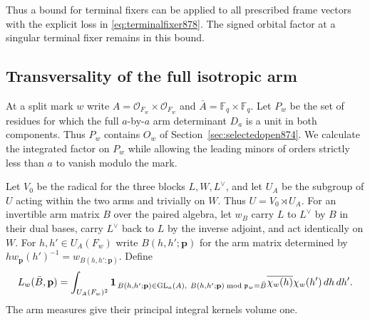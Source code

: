 \documentclass[a4paper,11pt]{article}
\theoremstyle{definition}
\theoremstyle{remark}
\numberwithin{equation}{section}
\begin{document}
Thus a bound for terminal fixers can be applied to all prescribed
frame vectors with the explicit loss in \eqref{eq:terminalfixer878}.
The signed orbital factor at a singular terminal fixer remains in
this bound.
\clearpage

\subsection{Transversality of the full isotropic arm}
\label{sec:armopen879}

At a split mark \(w\) write \(A=\mathcal O_{F_w}\times\mathcal O_{F_w}\)
and \(\bar A=\mathbb F_q\times\mathbb F_q\).
Let \(P_w\) be the set of residues for which the full \(a\)-by-\(a\)
arm determinant \(D_a\) is a unit in both components. Thus \(P_w\)
contains \(O_w\) of Section~\ref{sec:selectedopen874}. We calculate
the integrated factor on \(P_w\) while allowing the leading minors
of orders strictly less than \(a\) to vanish modulo the mark.

Let \(V_0\) be the radical for the three blocks \(L,W,L^\vee\),
and let \(U_A\) be the subgroup of \(U\) acting within the two arms
and trivially on \(W\). Thus \(U=V_0\rtimes U_A\). For an invertible
arm matrix \(B\) over the paired algebra, let \(w_B\) carry \(L\)
to \(L^\vee\) by \(B\) in their dual bases, carry \(L^\vee\) back to
\(L\) by the inverse adjoint, and act identically on \(W\).
For \(h,h'\in U_A(F_w)\) write \(B(h,h';\mathbf p)\) for the
arm matrix determined by \(h w_{\mathbf p}(h')^{-1}=w_{B(h,h';\mathbf p)}\).
Define
\[
 L_w(\bar B,\mathbf p)=\int_{U_A(F_w)^2}
 {\bf1}_{\,B(h,h';\mathbf p)\in{\rm GL}_a(A),\
             B(h,h';\mathbf p)\bmod\mathfrak p_w=\bar B}
      \overline{\chi_w(h)}\chi_w(h')\,dh\,dh' .
\]
The arm measures give their principal integral kernels volume one.
\end{document}
